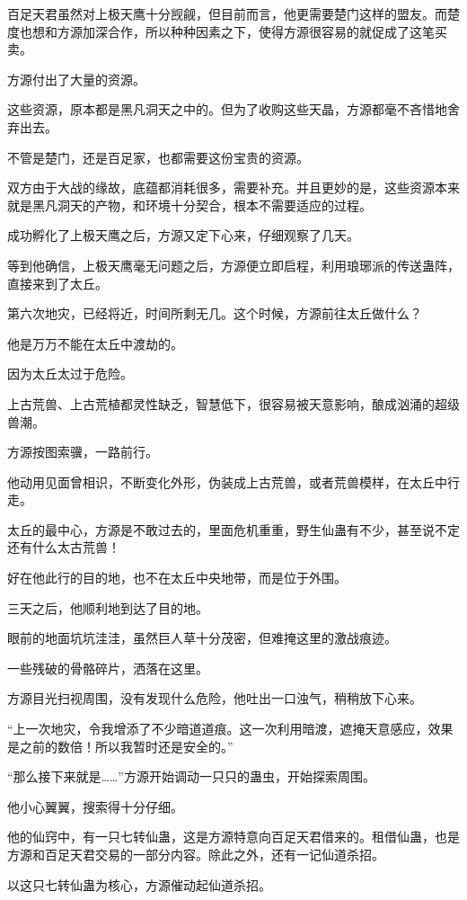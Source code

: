 \begin{this_body}
百足天君虽然对上极天鹰十分觊觎，但目前而言，他更需要楚门这样的盟友。而楚度也想和方源加深合作，所以种种因素之下，使得方源很容易的就促成了这笔买卖。

方源付出了大量的资源。

这些资源，原本都是黑凡洞天之中的。但为了收购这些天晶，方源都毫不吝惜地舍弃出去。

不管是楚门，还是百足家，也都需要这份宝贵的资源。

双方由于大战的缘故，底蕴都消耗很多，需要补充。并且更妙的是，这些资源本来就是黑凡洞天的产物，和环境十分契合，根本不需要适应的过程。

成功孵化了上极天鹰之后，方源又定下心来，仔细观察了几天。

等到他确信，上极天鹰毫无问题之后，方源便立即启程，利用琅琊派的传送蛊阵，直接来到了太丘。

第六次地灾，已经将近，时间所剩无几。这个时候，方源前往太丘做什么？

他是万万不能在太丘中渡劫的。

因为太丘太过于危险。

上古荒兽、上古荒植都灵性缺乏，智慧低下，很容易被天意影响，酿成汹涌的超级兽潮。

方源按图索骥，一路前行。

他动用见面曾相识，不断变化外形，伪装成上古荒兽，或者荒兽模样，在太丘中行走。

太丘的最中心，方源是不敢过去的，里面危机重重，野生仙蛊有不少，甚至说不定还有什么太古荒兽！

好在他此行的目的地，也不在太丘中央地带，而是位于外围。

三天之后，他顺利地到达了目的地。

眼前的地面坑坑洼洼，虽然巨人草十分茂密，但难掩这里的激战痕迹。

一些残破的骨骼碎片，洒落在这里。

方源目光扫视周围，没有发现什么危险，他吐出一口浊气，稍稍放下心来。

“上一次地灾，令我增添了不少暗道道痕。这一次利用暗渡，遮掩天意感应，效果是之前的数倍！所以我暂时还是安全的。”

“那么接下来就是……”方源开始调动一只只的蛊虫，开始探索周围。

他小心翼翼，搜索得十分仔细。

他的仙窍中，有一只七转仙蛊，这是方源特意向百足天君借来的。租借仙蛊，也是方源和百足天君交易的一部分内容。除此之外，还有一记仙道杀招。

以这只七转仙蛊为核心，方源催动起仙道杀招。


\end{this_body}
